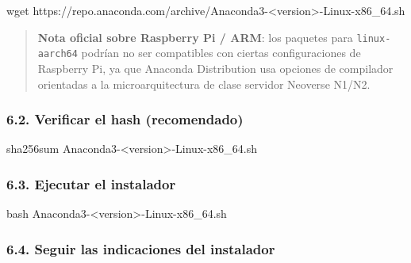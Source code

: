 \documentclass[
  doc,
  floatsintext,
  longtable,
  a4paper,
  nolmodern,
  notxfonts,
  notimes,
  12pt,
  colorlinks=true,linkcolor=blue,citecolor=blue,urlcolor=blue]{apa7}
\newenvironment{Shaded}{\begin{snugshade}}{\end{snugshade}}
\newcommand{\FunctionTok}[1]{\textcolor[rgb]{0.28,0.35,0.67}{#1}}
\newcommand{\NormalTok}[1]{\textcolor[rgb]{0.00,0.23,0.31}{#1}}
\newcommand{\OperatorTok}[1]{\textcolor[rgb]{0.37,0.37,0.37}{#1}}
\begin{document}
\begin{Shaded}
\begin{Highlighting}[]
\FunctionTok{wget}\NormalTok{ https://repo.anaconda.com/archive/Anaconda3{-}}\OperatorTok{\textless{}}\NormalTok{version}\OperatorTok{\textgreater{}}\NormalTok{{-}Linux{-}x86\_64.sh}
\end{Highlighting}
\end{Shaded}

\begin{quote}
\textbf{Nota oficial sobre Raspberry Pi / ARM}: los paquetes para
\texttt{linux-aarch64} podrían no ser compatibles con ciertas
configuraciones de Raspberry Pi, ya que Anaconda Distribution usa
opciones de compilador orientadas a la microarquitectura de clase
servidor Neoverse N1/N2.
\end{quote}

\subsubsection{6.2. Verificar el hash
(recomendado)}\label{verificar-el-hash-recomendado-1}

\begin{Shaded}
\begin{Highlighting}[]
\FunctionTok{sha256sum}\NormalTok{ Anaconda3{-}}\OperatorTok{\textless{}}\NormalTok{version}\OperatorTok{\textgreater{}}\NormalTok{{-}Linux{-}x86\_64.sh}
\end{Highlighting}
\end{Shaded}

\subsubsection{6.3. Ejecutar el
instalador}\label{ejecutar-el-instalador-1}

\begin{Shaded}
\begin{Highlighting}[]
\FunctionTok{bash}\NormalTok{ Anaconda3{-}}\OperatorTok{\textless{}}\NormalTok{version}\OperatorTok{\textgreater{}}\NormalTok{{-}Linux{-}x86\_64.sh}
\end{Highlighting}
\end{Shaded}

\subsubsection{6.4. Seguir las indicaciones del
instalador}\label{seguir-las-indicaciones-del-instalador-1}
\end{document}
